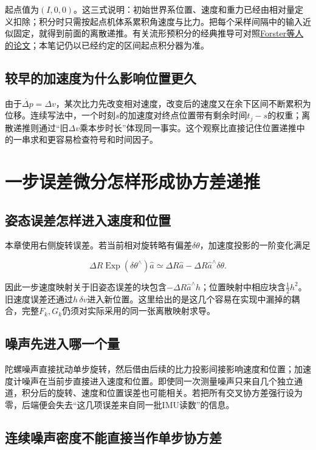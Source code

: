 起点值为$(I,0,0)$。这三式说明：初始世界系位置、速度和重力已经由相对量定义扣除；积分时只需按起点机体系累积角速度与比力。把每个采样间隔中的输入近似固定，就得到前面的离散递推。有关流形预积分的经典推导可对照\href{https://arxiv.org/abs/1512.02363}{Forster等人的论文}；本笔记仍以已经约定的区间起点积分器为准。

\subsection{较早的加速度为什么影响位置更久}

由于$\dot{\Delta p}=\Delta v$，某次比力先改变相对速度，改变后的速度又在余下区间不断累积为位移。连续写法中，一个时刻$s$的加速度对终点位置带有剩余时间$t_j-s$的权重；离散递推则通过“旧$\Delta v$乘本步时长”体现同一事实。这个观察比直接记住位置递推中的一串求和更容易检查符号和时间因子。

\section{一步误差微分怎样形成协方差递推}

\subsection{姿态误差怎样进入速度和位置}

本章使用右侧旋转误差。若当前相对旋转略有偏差$\delta\theta$，加速度投影的一阶变化满足

\begin{equation*}
\Delta R\operatorname{Exp}(\delta\theta^\wedge)\hat a
\simeq\Delta R\hat a-\Delta R\hat a^\wedge\delta\theta.
\end{equation*}

因此一步速度映射关于旧姿态误差的块包含$-\Delta R\hat a^\wedge h$；位置映射中相应块含$\tfrac12h^2$。旧速度误差还通过$h\,\delta v$进入新位置。这里给出的是这几个容易在实现中漏掉的耦合，完整$F_k,G_k$仍须对实际采用的同一张离散映射求导。

\subsection{噪声先进入哪一个量}

陀螺噪声直接扰动单步旋转，然后借由后续的比力投影间接影响速度和位置；加速度计噪声在当前步直接进入速度和位置。即使同一次测量噪声只来自几个独立通道，积分后的旋转、速度和位置误差也可能相关。若把所有交叉协方差强行设为零，后端便会失去“这几项误差来自同一批IMU读数”的信息。

\subsection{连续噪声密度不能直接当作单步协方差}

